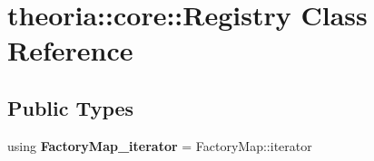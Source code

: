 \hypertarget{classtheoria_1_1core_1_1Registry}{\section{theoria\+:\+:core\+:\+:Registry Class Reference}
\label{classtheoria_1_1core_1_1Registry}
}
\subsection*{Public Types}
\begin{DoxyCompactItemize}
\item 
\hypertarget{classtheoria_1_1core_1_1Registry_ae131721f32d396fad4d2d48b0438dca1}{using {\bfseries Factory\+Map\+\_\+iterator} = Factory\+Map\+::iterator}\label{classtheoria_1_1core_1_1Registry_ae131721f32d396fad4d2d48b0438dca1}

\end{DoxyCompactItemize}
